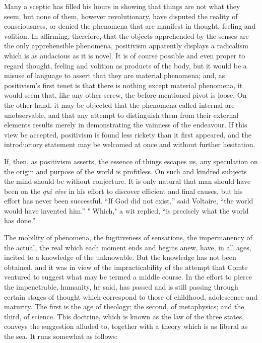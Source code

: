 \documentclass[]{book}
\begin{document}
Many a sceptic has filled his hours in showing that things are not what
they seem, but none of them, however revolutionary, have disputed the
reality of consciousness, or denied the phenomena that are manifest in
thought, feeling and volition. In affirming, therefore, that the objects
apprehended by the senses are the only apprehensible phenomena,
positivism apparently displays a radicalism which is as audacious as it
is novel. It is of course possible and even proper to regard thought,
feeling and volition as products of the body, but it would be a misuse
of language to assert that they are material phenomena; and, as
positivism's first tenet is that there is nothing except material
phenomena, it would seem that, like any other screw, the
before-mentioned pivot is loose. On the other hand, it may be objected
that the phenomena called internal are unobservable, and that any
attempt to distinguish them from their external elements results merely
in demonstrating the vainness of the endeavour. If this view be
accepted, positivism is found less rickety than it first appeared, and
the introductory statement may be welcomed at once and without further
hesitation.

If, then, as positivism asserts, the essence of things escapes us, any
speculation on the origin and purpose of the world is profitless. On
such and kindred subjects the mind should be without conjecture. It is
only natural that man should have been on the \emph{qui vive} in his
effort to discover efficient and final causes, but his effort has never
been successful. ``If God did not exist,'' said Voltaire, ``the world
would have invented him.'' " Which," a wit replied, ``is precisely what
the world has done.''

The mobility of phenomena, the fugitiveness of sensations, the
impermanency of the actual, the real which each moment ends and begins
anew, have, in all ages, incited to a knowledge of the unknowable. But
the knowledge has not been obtained, and it was in view of the
impracticability of the attempt that Comte ventured to suggest what may
be termed a middle course. In the effort to pierce the impenetrable,
humanity, he said, has passed and is still passing through certain
stages of thought which correspond to those of childhood, adolescence
and maturity. The first is the age of theology; the second, of
metaphysics; and the third, of science. This doctrine, which is known as
the law of the three states, conveys the suggestion alluded to, together
with a theory which is as liberal as the sea. It runs somewhat as
follows:
\end{document}
